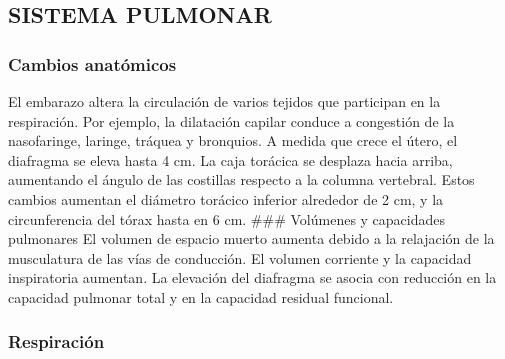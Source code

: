 \documentclass[
]{article}
\begin{document}
\hypertarget{sistema-pulmonar}{%
\subsection{SISTEMA PULMONAR}\label{sistema-pulmonar}}

\hypertarget{cambios-anatuxf3micos-1}{%
\subsubsection{Cambios anatómicos}\label{cambios-anatuxf3micos-1}}

El embarazo altera la circulación de varios tejidos que participan en la
respiración. Por ejemplo, la dilatación capilar conduce a congestión de
la nasofaringe, laringe, tráquea y bronquios. A medida que crece el
útero, el diafragma se eleva hasta 4 cm. La caja torácica se desplaza
hacia arriba, aumentando el ángulo de las costillas respecto a la
columna vertebral. Estos cambios aumentan el diámetro torácico inferior
alrededor de 2 cm, y la circunferencia del tórax hasta en 6 cm. \#\#\#
Volúmenes y capacidades pulmonares El volumen de espacio muerto aumenta
debido a la relajación de la musculatura de las vías de conducción. El
volumen corriente y la capacidad inspiratoria aumentan. La elevación del
diafragma se asocia con reducción en la capacidad pulmonar total y en la
capacidad residual funcional.

\hypertarget{respiraciuxf3n}{%
\subsubsection{Respiración}\label{respiraciuxf3n}}
\end{document}
